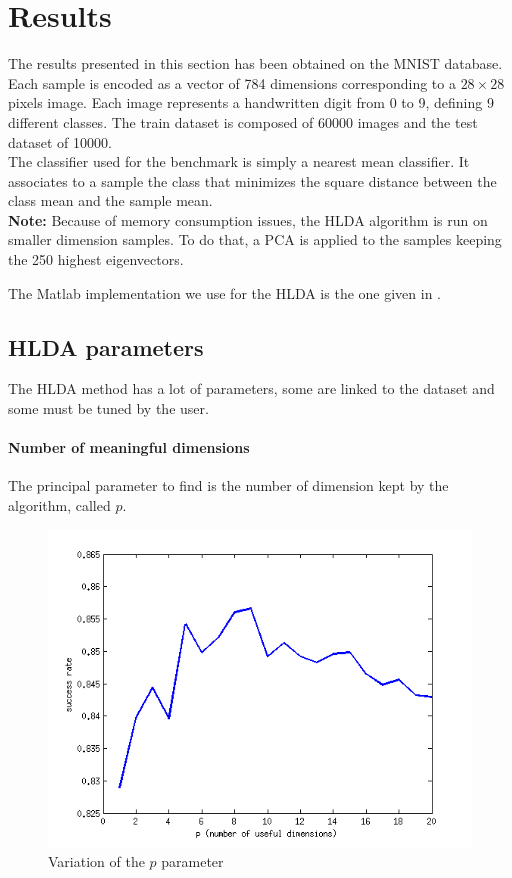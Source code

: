 
\section{Results}
\label{sec:results}

The results presented in this section has been obtained on the MNIST
database.  Each sample is encoded as a vector of 784 dimensions
corresponding to a $28 \times 28$ pixels image. Each image represents
a handwritten digit from 0 to 9, defining 9 different classes.
The train dataset is composed of 60000 images and the test dataset of 10000.\\

The classifier used for the benchmark is simply a nearest mean
classifier.  It associates to a sample the class that minimizes the
square distance between the class mean and
the sample mean.\\

{\bf Note:} Because of memory consumption issues, the HLDA algorithm
is run on smaller dimension samples. To do that, a PCA is applied to
the samples keeping the 250 highest eigenvectors.

The Matlab implementation we use for the HLDA is the one given in \cite{burget.2004}.

\subsection{HLDA parameters}

The HLDA method has a lot of parameters, some are linked to the
dataset and some must be tuned by the user.

\paragraph{Number of meaningful dimensions} The principal parameter to
find is the number of dimension kept by the algorithm, called $p$.

\begin{figure}[H!]
  \includegraphics[scale=0.75]{img/bench-classes}
  \caption{Variation of the $p$ parameter}
  \label{img:classes}
\end{figure}

